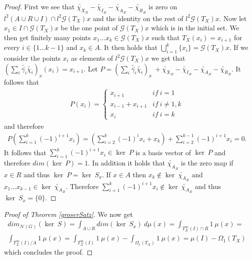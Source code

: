 \documentclass[12pt,a4paper]{scrartcl}
\numberwithin{equation}{section}
\newcommand{\2}{\mathbb{Z} / 2 \mathbb{Z}}
\newcommand{\G}{\mathcal{G}}
\newcommand{\1}{\bar{1}}
\newcommand{\0}{\bar{0}}
\begin{document}
\begin{proof}
	First we see that $\tilde{\chi_X}_x - \tilde{\chi_I}_x - \tilde{\chi_A}_x - \tilde{\chi_R}_x$ is zero on $l^2(A \cup R \cup I) \cap l^2 \G (T_X)x$ and the identity on the rest of $l^2 \G (T_X)x$. Now let $x_1 \in I \cap \G (T_X)x$ be the one point of $\G (T_X)x$ which is in the initial set. We then get finitely many points $x_1 \ldots x_k \in \G (T_X)x$ such that $T_X(x_i) = x_{i + 1}$ for every $i \in \{1 \ldots k - 1\}$ and $x_k \in A$. It then holds that $\bigcup_{i = 1}^{k} \{x_i\} = \G (T_X)x$. If we consider the points $x_i$ as elements of $l^2 \G (T_X)x$ we get that $(\sum_{i} \tilde{\bar{\gamma_i}} \tilde{\chi_i})_x(x_i) =x_{i+1}$. Let $P = (\sum_{i} \tilde{\bar{\gamma_i}} \tilde{\chi_i})_x \ + \tilde{\chi_X}_x - \tilde{\chi_I}_x - \tilde{\chi_A}_x - \tilde{\chi_R}_x$. It follows that
	\begin{align*}
		P(x_i) = \begin{cases}
		x_{i + 1} & if \ i = 1 \\
		x_{i - 1} + x_{i + 1} & if \ i \neq 1, k \\
		x_{i} & if \ i = k
		\end{cases}
	\end{align*}
	and therefore 
	\begin{align*}
		P(\sum_{i = 1}^{k} (-1)^{i + 1} x_i) = (\sum_{i = 2}^{k} (-1)^{i} x_{i} + x_k) + \sum_{i = 2}^{k - 1} (-1)^{i + 1} x_{i} = 0.
	\end{align*}
	It follows that $\sum_{i = 1}^{k} (-1)^{i + 1} x_i \in \ker \ P$ is a basis vector of $ \ker \ P$ and therefore $dim(\ker \ P) = 1$. In addition it holds that $\tilde{\chi_A}_x$ is the zero map if $x \in R$ and thus $\ker \ P = \ker \ S_x$. If $x \in A$ then $x_k \notin \ker \ \tilde{\chi_A}_x$ and $x_1 \ldots x_{k - 1} \in \ker \ \tilde{\chi_A}_x$. Therefore $\sum_{i = 1}^{k} (-1)^{i + 1} x_i \notin \ker \ \tilde{\chi_A}_x$ and thus $\ker \ S_x = \{0\}$.
\end{proof}
\begin{proof}[Proof of Theorem \ref{groserSatz}]
	We now get
	\begin{align*}
		dim_{\mathcal{N}(G)}(\ker \ S) = \int_{A \cup R} dim (\ker \ S_x) \ d \mu (x) = \int_{T_X^\infty(I) \cap R} 1 \ \mu (x) = \\ \int_{T_X^\infty(I) / A} 1 \ \mu (x) = \int_{T_X^\infty(I)} 1 \ \mu (x) - \int_{\Omega_1(T_X)} 1 \ \mu (x) = \mu(I) - \Omega_1(T_X)
	\end{align*}
	which concludes the proof. 
\end{proof}
\end{document}
